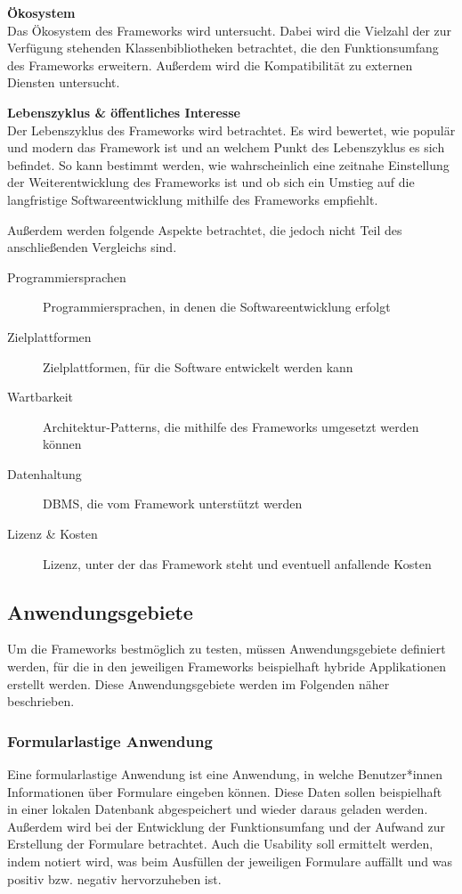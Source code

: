 \documentclass[]{lni}
\begin{document}
\textbf{Ökosystem}\\
Das Ökosystem des Frameworks wird untersucht. Dabei wird die Vielzahl der zur Verfügung stehenden Klassenbibliotheken betrachtet, die den Funktionsumfang des Frameworks erweitern. Außerdem wird die Kompatibilität zu externen Diensten untersucht.

\textbf{Lebenszyklus \& öffentliches Interesse}\\
Der Lebenszyklus des Frameworks wird betrachtet. Es wird bewertet, wie populär und modern das Framework ist und an welchem Punkt des Lebenszyklus es sich befindet. So kann bestimmt werden, wie wahrscheinlich eine zeitnahe Einstellung der Weiterentwicklung des Frameworks ist und ob sich ein Umstieg auf die langfristige Softwareentwicklung mithilfe des Frameworks empfiehlt.

Außerdem werden folgende Aspekte betrachtet, die jedoch nicht Teil des anschließenden Vergleichs sind.

\begin{description}
    \item[Programmiersprachen] Programmiersprachen, in denen die Softwareentwicklung erfolgt
    \item[Zielplattformen] Zielplattformen, für die Software entwickelt werden kann
    \item[Wartbarkeit] Architektur-Patterns, die mithilfe des Frameworks umgesetzt werden können
    \item[Datenhaltung] DBMS, die vom Framework unterstützt werden
    \item[Lizenz \& Kosten] Lizenz, unter der das Framework steht und eventuell anfallende Kosten
\end{description}


\subsection{Anwendungsgebiete}\label{subsec:areas}
Um die Frameworks bestmöglich zu testen, müssen Anwendungsgebiete definiert werden, für die in den jeweiligen Frameworks beispielhaft hybride Applikationen erstellt werden. Diese Anwendungsgebiete werden im Folgenden näher beschrieben.

\subsubsection*{Formularlastige Anwendung}
Eine formularlastige Anwendung ist eine Anwendung, in welche Benutzer*innen Informationen über Formulare eingeben können. Diese Daten sollen beispielhaft in einer lokalen Datenbank abgespeichert und wieder daraus geladen werden. Außerdem wird bei der Entwicklung der Funktionsumfang und der Aufwand zur Erstellung der Formulare betrachtet. Auch die Usability soll ermittelt werden, indem notiert wird, was beim Ausfüllen der jeweiligen Formulare auffällt und was positiv bzw. negativ hervorzuheben ist.
\end{document}
